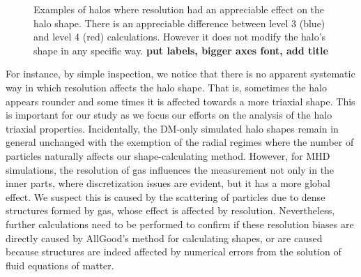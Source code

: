 \begin{figure}[!ht]
  \centering
  \hfill
  \caption{Examples of halos where resolution had an appreciable effect on the halo shape. There is an appreciable difference between level 3 (blue) and level 4 (red) calculations. However it does not modify the halo's shape in any specific way. \textbf{put labels, bigger axes font, add title} }
\end{figure}


For instance, by simple inspection, we notice that there is no apparent systematic way in which resolution affects the halo shape. That is, sometimes the halo appears rounder and some times it is affected towards a more triaxial shape. This is important for our study as we focus our efforts on the analysis of the halo triaxial properties. Incidentally, the DM-only simulated halo shapes remain in general unchanged with the exemption of the radial regimes where the number of particles naturally affects our shape-calculating method. However, for MHD simulations, the resolution of gas influences the measurement not only in the inner parts, where discretization issues are evident, but it has a more global effect. We suspect this is caused by the scattering of particles due to dense structures formed by gas, whose effect is affected by resolution. Nevertheless, further calculations need to be performed to confirm if these resolution biases are directly caused by AllGood's method for calculating shapes, or are caused because structures are indeed affected by numerical errors from the solution of fluid equations of matter.\\

